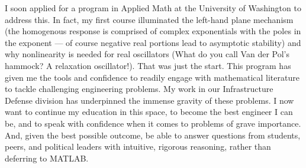 \documentclass[letterpaper]{article}
\begin{document}
I soon applied for a program in Applied Math at the University of Washington to address this.
In fact, my first course illuminated the left-hand plane mechanism (the homogenous response
is comprised of complex exponentials with the poles in the exponent --- of course
negative real portions lead to asymptotic stability) and why nonlinearity is needed for real
oscillators (What do you call Van der Pol's hammock? A relaxation oscillator!). That was just
the start.
This program has given me the tools and confidence to readily engage with mathematical literature
to tackle challenging engineering problems. My work in our Infrastructure Defense division has
underpinned the immense gravity of these problems. I now want to continue my education in this
space, to become the best engineer I can be, and to speak with confidence when it comes
to problems of grave importance. And, given the best possible
outcome, be able to answer questions from students, peers, and political leaders
with intuitive, rigorous reasoning, rather than deferring to MATLAB.


\end{document}
